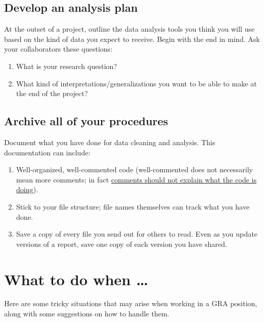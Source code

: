 \documentclass[
]{book}
\begin{document}
\hypertarget{develop-an-analysis-plan}{%
\subsection{Develop an analysis plan}\label{develop-an-analysis-plan}}

At the outset of a project, outline the data analysis tools you think you will use based on the kind of data you expect to receive. Begin with the end in mind. Ask your collaborators these questions:

\begin{enumerate}
\def\labelenumi{\arabic{enumi}.}
\item
  What is your research question?
\item
  What kind of interpretations/generalizations you want to be able to make at the end of the project?
\end{enumerate}

\hypertarget{archive-all-of-your-procedures}{%
\subsection{Archive all of your procedures}\label{archive-all-of-your-procedures}}

Document what you have done for data cleaning and analysis. This documentation can include:

\begin{enumerate}
\def\labelenumi{\arabic{enumi}.}
\item
  Well-organized, well-commented code (well-commented does not necessarily mean more comments; in fact \href{https://visualstudiomagazine.com/articles/2013/07/26/why-commenting-code-is-still-bad.aspx}{comments should not explain what the code is doing}).
\item
  Stick to your file structure; file names themselves can track what you have done.
\item
  Save a copy of every file you send out for others to read. Even as you update versions of a report, save one copy of each version you have shared.
\end{enumerate}

\hypertarget{what-to-do-when}{%
\section{What to do when \ldots{}}\label{what-to-do-when}}

Here are some tricky situations that may arise when working in a GRA position, along with some suggestions on how to handle them.
\end{document}
